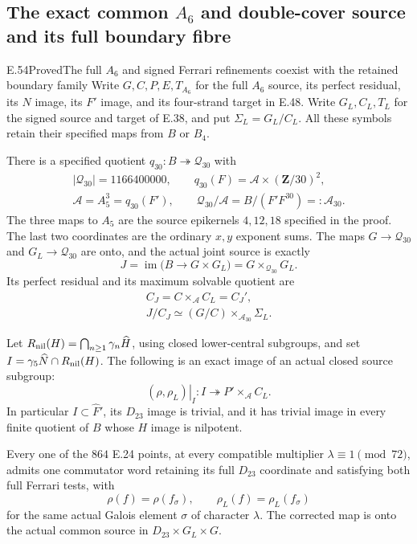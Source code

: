 \subsection{The exact common \texorpdfstring{$A_6$}{A6} and double-cover source and its full boundary fibre}

\begin{statement}{E.54}{Proved}{The full $A_6$ and signed Ferrari refinements coexist with the retained boundary family}
Write $G,C,P,E,T_{A_6}$ for the full $A_6$ source, its
perfect residual, its $N$ image, its $F'$ image, and its
four-strand target in E.48.  Write $G_L,C_L,T_L$ for
the signed source and target of E.38, and put
$\Sigma_L=G_L/C_L$.  All these symbols retain their
specified maps from $B$ or $B_4$.

There is a specified quotient $q_{30}:B\twoheadrightarrow
\mathcal Q_{30}$ with
\[
 \begin{gathered}
 |\mathcal Q_{30}|=1166400000,\qquad
 q_{30}(F)=\mathcal A\times(\mathbf Z/30)^2,\\
 \mathcal A=A_5^3=q_{30}(F'),\qquad
 \mathcal Q_{30}/\mathcal A
       =B/(F'F^{30})=:\mathcal A_{30}.
 \end{gathered}
 \tag{E.54.1}
\]
The three maps to $A_5$ are the source epikernels
$4,12,18$ specified in the proof.  The last two coordinates
are the ordinary $x,y$ exponent sums.  The maps $G\to
\mathcal Q_{30}$ and $G_L\to\mathcal Q_{30}$ are onto,
and the actual joint source is exactly
\[
 J=\operatorname{im}\bigl(B\longrightarrow G\times G_L\bigr)
     =G\times_{\mathcal Q_{30}}G_L.
 \tag{E.54.2}
\]
Its perfect residual and its maximum solvable quotient are
\[
 \begin{gathered}
 C_J=C\times_{\mathcal A}C_L=C_J',\\
 J/C_J\simeq (G/C)\times_{\mathcal A_{30}}\Sigma_L.
 \end{gathered}
 \tag{E.54.3}
\]

Let $R_{\rm nil}(H)=\bigcap_{n\ge1}\gamma_n\widehat H$,
using closed lower-central subgroups, and set
$I=\gamma_5\widehat N\cap R_{\rm nil}(H)$.
The following is an exact image of an actual closed source
subgroup:
\[
 \left.(\rho,\rho_L)\right|_I:
 I\twoheadrightarrow
       P'\times_{\mathcal A}C_L.
 \tag{E.54.4}
\]
In particular $I\subset\widehat F'$, its $D_{23}$ image is
trivial, and it has trivial image in every finite quotient
of $B$ whose $H$ image is nilpotent.

Every one of the $864$ E.24 points, at every compatible
multiplier $\lambda\equiv1\pmod{72}$, admits one commutator
word retaining its full $D_{23}$ coordinate and satisfying
both full Ferrari tests, with
\[
       \rho(f)=\rho(f_\sigma),\qquad
       \rho_L(f)=\rho_L(f_\sigma)
 \tag{E.54.5}
\]
for the same actual Galois element $\sigma$ of character
$\lambda$.  The corrected map is onto the actual common
source in $D_{23}\times G_L\times G$.


\end{statement}
